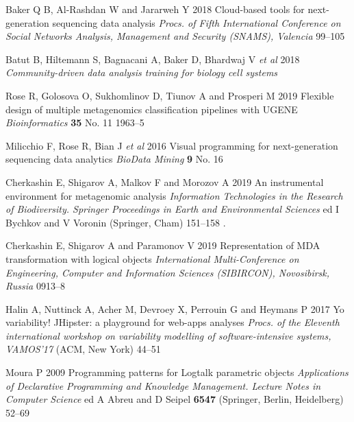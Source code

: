 \documentclass[a4paper]{jpconf}
\renewcommand{\doi}[1]{} %
\begin{document}
\begin{thebibliography}{0}
 Baker Q B,  Al-Rashdan W and Jararweh Y 2018 Cloud-based tools for next-generation sequencing data analysis \emph{Procs. of Fifth International Conference on Social Networks Analysis, Management and Security (SNAMS), Valencia} 99--105 \doi{10.1109/SNAMS.2018.8554515}


 Batut B, Hiltemann S, Bagnacani A, Baker D, Bhardwaj V \emph{et al} 2018 \emph{Community-driven data analysis training for biology cell systems} \doi{10.1016/j.cels.2018.05.012}

  Rose R, Golosova O, Sukhomlinov D, Tiunov A and Prosperi M 2019 Flexible design of multiple metagenomics classification pipelines with UGENE \emph{Bioinformatics} \textbf{35} No. 11 1963--5 \doi{10.1093/bioinformatics/bty901}

 Milicchio F, Rose R, Bian J \emph{et al} 2016 Visual programming for next-generation sequencing data analytics \emph{BioData Mining} \textbf{9} No. 16 \doi{10.1186/s13040-016-0095-3}

 Cherkashin E, Shigarov A, Malkov F and Morozov A 2019 An instrumental environment for metagenomic analysis \emph{Information Technologies in the Research of Biodiversity. Springer Proceedings in Earth and Environmental Sciences} ed I Bychkov and V Voronin (Springer, Cham) 151--158 \doi{10.1007/978-3-030-11720-7_20}.

  Cherkashin E, Shigarov A and Paramonov V 2019 Representation of MDA transformation with logical objects \emph{International Multi-Conference on Engineering, Computer and Information Sciences (SIBIRCON), Novosibirsk, Russia} 0913--8 \doi{10.1109/SIBIRCON48586.2019.8958008}

 Halin A, Nuttinck A, Acher M, Devroey X, Perrouin G and Heymans P 2017 Yo variability! JHipster: a playground for web-apps analyses \emph{Procs. of the Eleventh international workshop on variability modelling of software-intensive systems, VAMOS’17} (ACM, New York) 44–51 \doi{10.1145/3023956.3023963}

 Moura P 2009 Programming patterns for Logtalk parametric objects \emph{Applications of Declarative Programming and Knowledge Management. Lecture Notes in Computer Science} ed A Abreu and D Seipel \textbf{6547} (Springer, Berlin, Heidelberg) 52--69 \doi{10.1007/978-3-642-20589-7_4}


\end{thebibliography}
\end{document}
